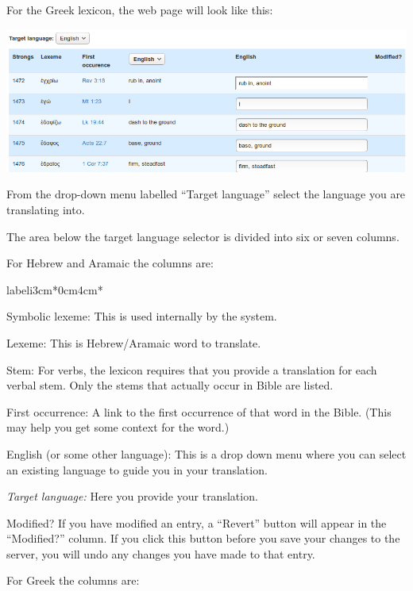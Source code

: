 \documentclass[11pt,oneside,a4paper]{memoir}
\begin{document}
For the Greek lexicon, the web page will look like this:

\begin{center}
  \includegraphics[width=0.9\linewidth]{lexiconGr.png}
\end{center}

From the drop-down menu labelled ``Target language'' select the language you are translating into.

The area below the target language selector is divided into six or seven columns.

For Hebrew and Aramaic the columns are:

\begin{flexlabelled}{labeli}{3cm}{*}{0cm}{4cm}{*}
\item[Symbolic lexeme:\hfill] This is used internally by the system.
\item[Lexeme:] This is Hebrew/Aramaic word to translate.
\item[Stem:] For verbs, the lexicon requires that you provide a translation for each verbal stem.
  Only the stems that actually occur in Bible are listed.
\item[First occurrence:\hfill] A link to the first occurrence of that word in the Bible. (This may
  help you get some context for the word.)
\item[English (or some other language):] This is a drop down menu where you can select an existing
  language to guide you in your translation.
\item[\emph{Target language:}\hfill]  Here you provide your translation.
\item[Modified?] If you have modified an entry, a ``Revert'' button will appear in the ``Modified?''
  column. If you click this button before you save your changes to the server, you will undo any
  changes you have made to that entry.
\end{flexlabelled}

For Greek the columns are:
\end{document}
